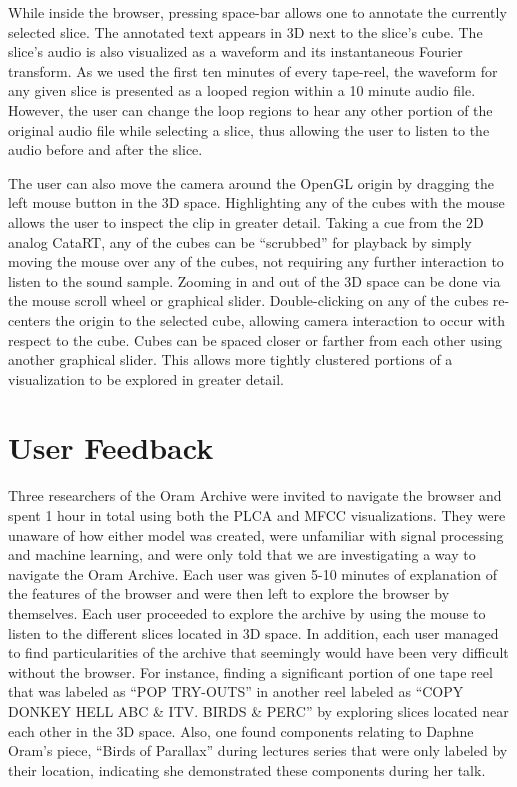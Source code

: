While inside the browser, pressing space-bar allows one to annotate the currently selected slice.  The annotated text appears in 3D next to the slice's cube.  The slice's audio is also visualized as a waveform and its instantaneous Fourier transform.  As we used the first ten minutes of every tape-reel, the waveform for any given slice is presented as a looped region within a 10 minute audio file.  However, the user can change the loop regions to hear any other portion of the original audio file while selecting a slice, thus allowing the user to listen to the audio before and after the slice.

The user can also move the camera around the OpenGL origin by dragging the left mouse button in the 3D space.   Highlighting any of the cubes with the mouse allows the user to inspect the clip in greater detail.  Taking a cue from the 2D analog CataRT, any of the cubes can be ``scrubbed'' for playback by simply moving the mouse over any of the cubes, not requiring any further interaction to listen to the sound sample.  Zooming in and out of the 3D space can be done via the mouse scroll wheel or graphical slider.  Double-clicking on any of the cubes re-centers the origin to the selected cube, allowing camera interaction to occur with respect to the cube.  Cubes can be spaced closer or farther from each other using another graphical slider.  This allows more tightly clustered portions of a visualization to be explored in greater detail.  



\section{User Feedback}\label{results}

Three researchers of the Oram Archive were invited to navigate the browser and spent 1 hour in total using both the PLCA and MFCC visualizations.  They were unaware of how either model was created, were unfamiliar with signal processing and machine learning, and were only told that we are investigating a way to navigate the Oram Archive.  Each user was given 5-10 minutes of explanation of the features of the browser and were then left to explore the browser by themselves.  Each user proceeded to explore the archive by using the mouse to listen to the different slices located in 3D space.  In addition, each user managed to find particularities of the archive that seemingly would have been very difficult without the browser.  For instance, finding a significant portion of one tape reel that was labeled as ``POP TRY-OUTS'' in another reel labeled as ``COPY DONKEY HELL ABC \& ITV. BIRDS \& PERC'' by exploring slices located near each other in the 3D space.  Also, one found components relating to Daphne Oram's piece, ``Birds of Parallax'' during lectures series that were only labeled by their location, indicating she demonstrated these components during her talk.


